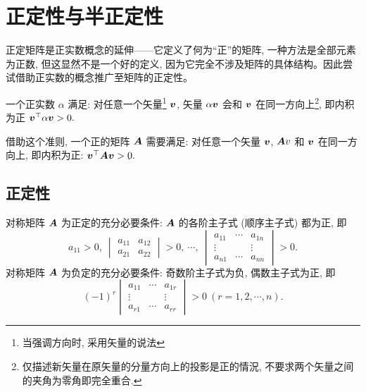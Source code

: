 \section{正定性与半正定性}

正定矩阵是正实数概念的延伸——它定义了何为“正”的矩阵, 一种方法是全部元素为正数, 但这显然不是一个好的定义, 
因为它完全不涉及矩阵的具体结构。因此尝试借助正实数的概念推广至矩阵的正定性。

一个正实数 $\alpha$ 满足: 对任意一个矢量\footnote{当强调方向时, 采用矢量的说法} $\vb*{v}$, 矢量 $\alpha\vb*{v}$ 会和 $\vb*{v}$ 在同一方向上\footnote{仅描述新矢量在原矢量的分量方向上的投影是正的情況, 不要求两个矢量之间的夹角为零角即完全重合.}, 即内积为正 $\vb*{v}^\top\alpha\vb*{v}>0.$

借助这个准则, 一个正的矩阵 $\vb*{A}$ 需要满足: 对任意一个矢量 $\vb*{v}$, $\vb*{A}v$ 和 $\vb*{v}$ 在同一方向上, 即内积为正: $\vb*{v}^\top\vb*{A}\vb*{v}>0.$

\subsection{正定性}

\begin{theorem}[Hurwitz 定理]
    对称矩阵 $\vb*{A}$ 为正定的充分必要条件: $\vb*{A}$ 的各阶主子式 (顺序主子式) 都为正, 即
    $$a_{11}>0,~\begin{vmatrix}
            a_{11} & a_{12} \\
            a_{21} & a_{22}
        \end{vmatrix}>0,~\cdots,~\begin{vmatrix}
            a_{11} & \cdots & a_{1n}  \\
            \vdots &        & \vdots\ \\
            a_{n1} & \cdots & a_{nn}
        \end{vmatrix}>0.$$
    对称矩阵 $\vb*{A}$  为负定的充分必要条件: 奇数阶主子式为负, 偶数主子式为正, 即
    $$(-1)^r\begin{vmatrix}
            a_{11} & \cdots & a_{1r} \\
            \vdots &        & \vdots \\
            a_{r1} & \cdots & a_{rr}
        \end{vmatrix}>0~  (r=1,2,\cdots ,n).$$
    \label{Hurwitztheorem}
\end{theorem}

